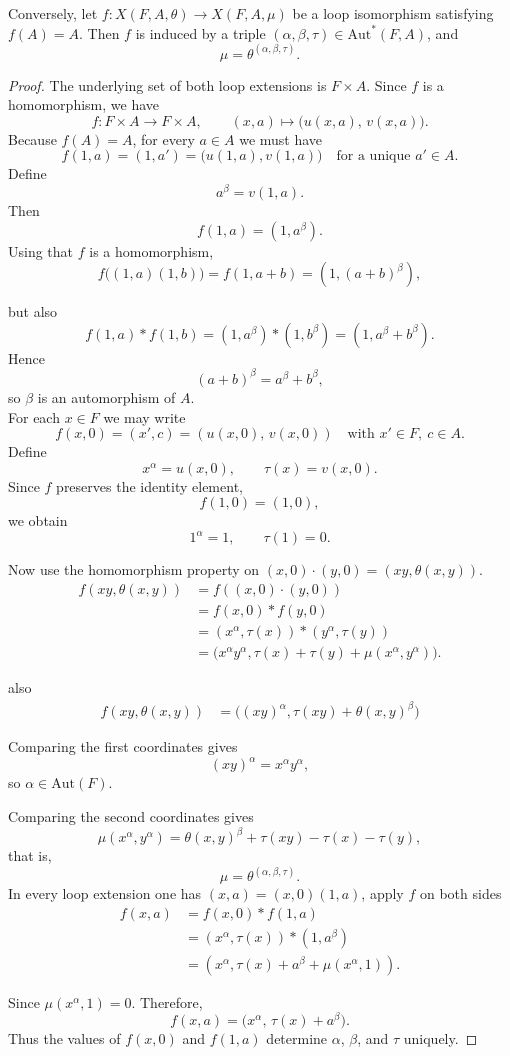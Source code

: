 \documentclass[10pt,a4paper]{amsart}
\begin{document}
\begin{lemma} \label{lemma:2}
Conversely, let 
$f:X(F,A,\theta)\to X(F,A,\mu)$ 
be a loop isomorphism satisfying $f(A)=A$. 
Then $f$ is induced by a triple 
$(\alpha,\beta,\tau)\in\mathrm{Aut}^{\!*}(F,A)$, and
\[
\mu=\theta^{(\alpha,\beta,\tau)}.
\]
\end{lemma}

\begin{proof}
The underlying set of both loop extensions is $F\times A$. 
Since $f$ is a homomorphism, we have
\[
f:F\times A\longrightarrow F\times A,
\qquad
(x,a)\longmapsto\bigl(u(x,a),\,v(x,a)\bigr).
\]
Because $f(A)=A$, for every $a\in A$ we must have
\[
f(1,a)=(1,a')=\big(u(1,a),v(1,a)\big) \quad\text{for a unique }a'\in A.
\]
Define
\[
a^\beta=v(1,a).
\]
Then
\[
f(1,a)=(1,a^{\beta}).
\]
Using that $f$ is a homomorphism,
\[
f\bigl((1,a)(1,b)\bigr)
=
f(1,a+b)
=
(1,(a+b)^{\beta}),
\]

but also
\[
f(1,a)*f(1,b)=(1,a^{\beta})*(1,b^{\beta})
=(1,a^{\beta}+b^{\beta}).
\]
Hence
\[
(a+b)^{\beta}=a^{\beta}+b^{\beta},
\]
so $\beta$ is an automorphism of $A$.\\
For each $x\in F$ we may write
\[
f(x,0)=(x',c)=(u(x,0),\,v(x,0))
\quad\text{with }x'\in F,\ c\in A.
\]
Define
\[
x^\alpha=u(x,0),\qquad \tau(x)=v(x,0).
\]
Since $f$ preserves the identity element,
\[
f(1,0)=(1,0),
\]
we obtain
\[
1^\alpha=1,\qquad \tau(1)=0.
\]

Now use the homomorphism property on $(x,0)\cdot(y,0)=(xy,\theta(x,y))$.
\begin{align*}
f(xy,\theta(x,y)) &= f((x,0)\cdot(y,0))\\
&= f(x,0)*f(y,0)\\
&= (x^{\alpha},\tau(x))*(y^{\alpha},\tau(y))\\
&=\bigl(x^{\alpha}y^{\alpha},\tau(x)+\tau(y)+\mu(x^{\alpha},y^{\alpha})\bigr).
\end{align*}

also
\begin{align*}
f(xy,\theta(x,y)) &= \big((xy)^{\alpha},\tau(xy)+\theta(x,y)^{\beta}\big) 
\end{align*}


Comparing the first coordinates gives
\[
(xy)^{\alpha}=x^{\alpha}y^{\alpha},
\]
so $\alpha\in\mathrm{Aut}(F)$.

Comparing the second coordinates gives
\[
\mu(x^{\alpha},y^{\alpha})
=
\theta(x,y)^{\beta}
+\tau(xy)-\tau(x)-\tau(y),
\]
that is,
\[
\mu=\theta^{(\alpha,\beta,\tau)}.
\]
In every loop extension one has $(x,a)=(x,0)(1,a)$, apply $f$ on both sides
\begin{align*}
f(x,a)&=f(x,0)*f(1,a)\\
&=(x^{\alpha},\tau(x))*(1,a^{\beta})\\
&=(x^{\alpha},\tau(x)+a^{\beta}+\mu(x^{\alpha},1)).
\end{align*}

Since $\mu(x^{\alpha},1)=0$. Therefore,
\[
f(x,a)=\bigl(x^{\alpha},\,\tau(x)+a^{\beta}\bigr).
\]
Thus the values of $f(x,0)$ and $f(1,a)$ determine $\alpha$, $\beta$, and $\tau$ uniquely.
\end{proof}
\end{document}
